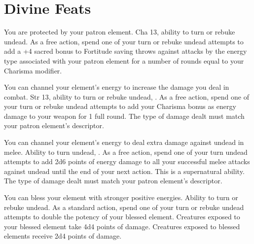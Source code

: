 \section{Divine Feats}

{You are protected by your patron element.}
{Cha 13, ability to turn or rebuke undead.}
{As a free action, spend one of your turn or rebuke undead attempts to add a +4 sacred bonus to Fortitude saving throws against attacks by the energy type associated with your patron element for a number of rounds equal to your Charisma modifier.}
{}{}

{You can channel your element's energy to increase the damage you deal in combat.}
{Str 13, ability to turn or rebuke undead, .}
{As a free action, spend one of your turn or rebuke undead attempts to add your Charisma bonus as energy damage to your weapon for 1 full round. The type of damage dealt must match your patron element's descriptor.}
{}{}

{You can channel your element's energy to deal extra damage against undead in melee.}
{Ability to turn undead, .}
{As a free action, spend one of your turn undead attempts to add 2d6 points of energy damage to all your successful melee attacks against undead until the end of your next action. This is a supernatural ability. The type of damage dealt must match your patron element's descriptor.}
{}{}

{You can bless your element with stronger positive energies.}
{Ability to turn or rebuke undead.}
{As a standard action, spend one of your turn or rebuke undead attempts to double the potency of your blessed element. Creatures exposed to your blessed element take 4d4 points of damage.}
{Creatures exposed to blessed elements receive 2d4 points of damage.}
{}